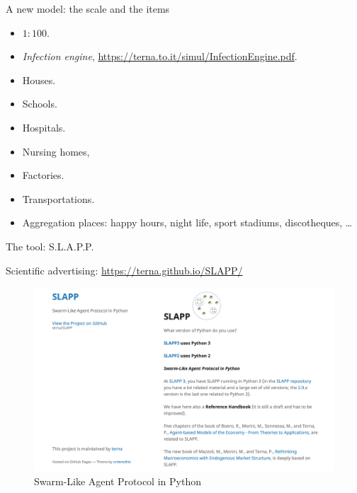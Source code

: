 \documentclass[8pt]{beamer}
\begin{document}
\begin{frame}{A new model: the scale and the items}

\begin{itemize}

\item $1:100$.

\item \textit{Infection engine}, \url{https://terna.to.it/simul/InfectionEngine.pdf}.

\item Houses.
\item Schools.
\item Hospitals.
\item Nursing homes,
\item Factories.
\color{red}
\item Transportations.
\item Aggregation places: happy hours, night life, sport stadiums, discotheques, \ldots

\end{itemize}

\end{frame}

\begin{frame}{The tool: S.L.A.P.P.}

Scientific advertising: \url{https://terna.github.io/SLAPP/}

\begin{figure}[H]
\center
\includegraphics[scale=0.26]{SLAPP.png}

\caption{Swarm-Like Agent Protocol in Python} 
\label{SLAPP}
\end{figure}

\end{frame}
\end{document}
